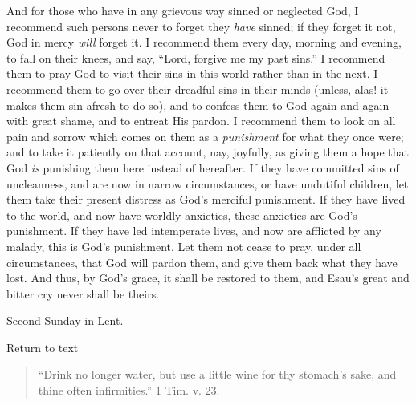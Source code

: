 And for those who have in any grievous way sinned or neglected God, I
recommend such persons never to forget they \emph{have} sinned; if they
forget it not, God in mercy \emph{will} forget it. I recommend them
every day, morning and evening, to fall on their knees, and say,
``Lord, forgive me my past sins.'' I recommend them to pray God
to visit their sins in this world rather than in the next. I recommend
them to go over their dreadful sins in their minds (unless, alas! it
makes them sin afresh to do so), and to confess them to God again and
again with great shame, and to entreat His pardon. I recommend them to
look on all pain and sorrow which comes on them as a \emph{punishment}
for what they once were; and to take it patiently on that account, nay,
joyfully, as giving them a hope that God \emph{is} punishing them here
instead of hereafter. If they have committed sins of uncleanness, and
are now in narrow circumstances, or have undutiful children, let them
take their present distress as God's merciful punishment. If they have
lived to the world, and now have worldly anxieties, these anxieties are
God's punishment. If they have led intemperate lives, and now are
afflicted by any malady, this is God's punishment. Let them not cease to
pray, under all circumstances, that God will pardon them, and give them
back what they have lost. And thus, by God's grace, it shall be restored
to them, and Esau's great and bitter cry never shall be theirs.


Second Sunday in Lent.

Return to text


\begin{quote}

``Drink no longer water, but use a little wine for thy
stomach's sake, and thine often infirmities.'' 1 Tim. v. 23.

\end{quote}

